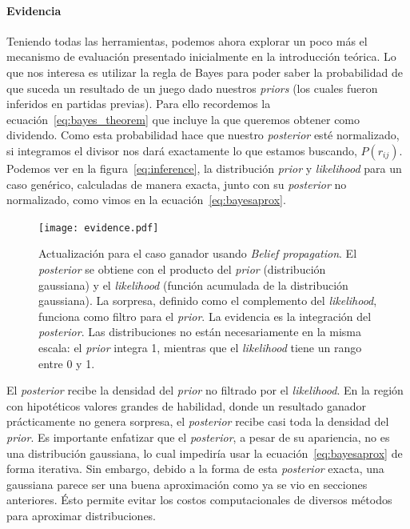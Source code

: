 \documentclass[11pt,twoside,spanish]{report} %
\begin{document}
\paragraph{Evidencia}
Teniendo todas las herramientas, podemos ahora explorar un poco m\'as el mecanismo de evaluaci\'on presentado inicialmente en la introducci\'on te\'orica.
Lo que nos interesa es utilizar la regla de Bayes para poder saber la probabilidad de que suceda un resultado de un juego dado nuestros \textit{priors} (los cuales fueron inferidos en partidas previas).
Para ello recordemos la ecuaci\'on~\ref{eq:bayes_theorem} que incluye la que queremos obtener como dividendo.
Como esta probabilidad hace que nuestro \textit{posterior} est\'e normalizado, si integramos el divisor nos dar\'a exactamente lo que estamos buscando, $P(r_{ij})$.
Podemos ver en la figura~\ref{eq:inference}, la distribuci\'on \textit{prior} y \textit{likelihood} para un caso gen\'erico, calculadas de manera exacta, junto con su \textit{posterior} no normalizado, como vimos en la ecuaci\'on~\ref{eq:bayesaprox}.

\begin{figure}[H]
	\centering
	\texttt{[image: evidence.pdf]}
	\caption{Actualizaci\'on para el caso ganador usando \textit{Belief propagation}. El \textit{posterior} se obtiene con el producto del \textit{prior} (distribuci\'on gaussiana) y el \textit{likelihood} (funci\'on acumulada de la distribuci\'on gaussiana). La sorpresa, definido como el complemento del \textit{likelihood}, funciona como filtro para el \textit{prior}. La evidencia es la integraci\'on del \textit{posterior}. Las distribuciones no est\'an necesariamente en la misma escala: el \textit{prior} integra 1, mientras que el \textit{likelihood} tiene un rango entre 0 y 1.}
	\label{fig:evidencia}
\end{figure}

El \textit{posterior} recibe la densidad del \textit{prior} no filtrado por el \textit{likelihood}.
En la regi\'on con hipot\'eticos valores grandes de habilidad, donde un resultado ganador pr\'acticamente no genera sorpresa, el \textit{posterior} recibe casi toda la densidad del \textit{prior}.
Es importante enfatizar que el \textit{posterior}, a pesar de su apariencia, no es una distribuci\'on gaussiana, lo cual impedir\'ia usar la ecuaci\'on~\ref{eq:bayesaprox} de forma iterativa.
Sin embargo, debido a la forma de esta \textit{posterior} exacta, una gaussiana parece ser una buena aproximaci\'on como ya se vio en secciones anteriores.
\'Esto permite evitar los costos computacionales de diversos m\'etodos para aproximar distribuciones.
\end{document}
